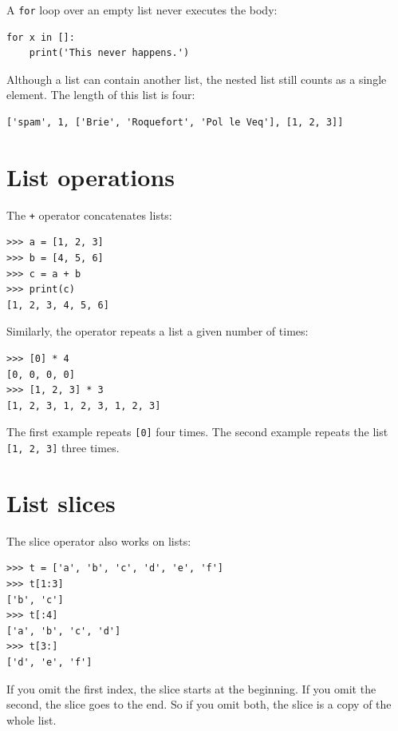 \documentclass[10pt]{book}
\begin{document}

A {\tt for} loop over an empty list never executes the body:

\beforeverb
\begin{verbatim}
for x in []:
    print('This never happens.')
\end{verbatim}
\afterverb
%
Although a list can contain another list, the nested
list still counts as a single element.  The length of this list is
four:


\beforeverb
\begin{verbatim}
['spam', 1, ['Brie', 'Roquefort', 'Pol le Veq'], [1, 2, 3]]
\end{verbatim}
\afterverb



\section{List operations}

The {\tt +} operator concatenates lists:


\beforeverb
\begin{verbatim}
>>> a = [1, 2, 3]
>>> b = [4, 5, 6]
>>> c = a + b
>>> print(c)
[1, 2, 3, 4, 5, 6]
\end{verbatim}
\afterverb
%
Similarly, the {\tt *} operator repeats a list a given number of times:


\beforeverb
\begin{verbatim}
>>> [0] * 4
[0, 0, 0, 0]
>>> [1, 2, 3] * 3
[1, 2, 3, 1, 2, 3, 1, 2, 3]
\end{verbatim}
\afterverb
%
The first example repeats {\tt [0]} four times.  The second example
repeats the list {\tt [1, 2, 3]} three times.


\section{List slices}


The slice operator also works on lists:

\beforeverb
\begin{verbatim}
>>> t = ['a', 'b', 'c', 'd', 'e', 'f']
>>> t[1:3]
['b', 'c']
>>> t[:4]
['a', 'b', 'c', 'd']
>>> t[3:]
['d', 'e', 'f']
\end{verbatim}
\afterverb
%
If you omit the first index, the slice starts at the beginning.
If you omit the second, the slice goes to the end.  So if you
omit both, the slice is a copy of the whole list.
\end{document}
